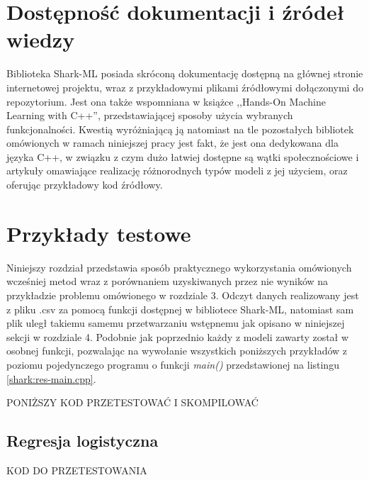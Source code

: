 
\section{Dostępność dokumentacji i źródeł wiedzy}

Biblioteka Shark-ML posiada skróconą dokumentację dostępną na głównej stronie internetowej projektu, wraz z przykładowymi plikami źródłowymi dołączonymi do repozytorium. Jest ona także wspomniana w książce ,,Hands-On Machine Learning with C++'', przedstawiającej sposoby użycia wybranych funkcjonalności. Kwestią wyróżniającą ją natomiast na tle pozostałych bibliotek omówionych w ramach niniejszej pracy jest fakt, że jest ona dedykowana dla języka C++, w związku z czym dużo łatwiej dostępne są wątki społecznościowe i artykuły omawiające realizację różnorodnych typów modeli z jej użyciem, oraz oferując przykładowy kod źródłowy.

\section{Przykłady testowe}

Niniejszy rozdział przedstawia sposób praktycznego wykorzystania omówionych wcześniej metod wraz z porównaniem uzyskiwanych przez nie wyników na przykładzie problemu omówionego w rozdziale 3. Odczyt danych realizowany jest z pliku .csv za pomocą funkcji dostępnej w bibliotece Shark-ML, natomiast sam plik uległ takiemu samemu przetwarzaniu wstępnemu jak opisano w niniejszej sekcji w rozdziale 4. Podobnie jak poprzednio każdy z modeli zawarty został w osobnej funkcji, pozwalając na wywołanie wszystkich poniższych przykładów z poziomu pojedynczego programu o funkcji \textit{main()} przedstawionej na listingu \ref{shark:res-main.cpp}.

PONIŻSZY KOD PRZETESTOWAĆ I SKOMPILOWAĆ



\subsection{Regresja logistyczna}

KOD DO PRZETESTOWANIA


